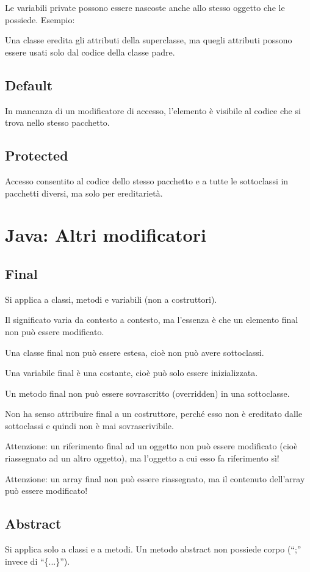 \documentclass[10pt]{article}
\begin{document}
Le variabili private possono essere nascoste anche allo stesso oggetto che le possiede.
Esempio:

Una classe eredita gli attributi della superclasse, ma quegli attributi possono essere usati solo dal codice della classe padre.
\subsection{Default}
In mancanza di un modificatore di accesso, l'elemento è visibile al codice che si trova nello stesso pacchetto.
\subsection{Protected}
Accesso consentito al codice dello stesso pacchetto e a tutte le sottoclassi in pacchetti diversi, ma solo per ereditarietà.
\section{Java: Altri modificatori}
\subsection{Final}
Si applica a classi, metodi e variabili (non a costruttori).

Il significato varia da contesto a contesto, ma l’essenza è che un elemento final non può essere modificato.

Una classe final non può essere estesa, cioè non può avere sottoclassi.

Una variabile final è una costante, cioè può solo essere inizializzata.

Un metodo final non può essere sovrascritto (overridden) in
una sottoclasse.

Non ha senso attribuire final a un costruttore, perché esso
non è ereditato dalle sottoclassi e quindi non è mai sovrascrivibile.

Attenzione: un riferimento final ad un oggetto non può essere
modificato (cioè riassegnato ad un altro oggetto), ma l’oggetto a cui esso fa riferimento sì!

Attenzione: un array final non può essere riassegnato, ma il
contenuto dell’array può essere modificato!
\subsection{Abstract}
Si applica solo a classi e a metodi.
Un metodo abstract non possiede corpo (“;” invece di “\{...\}”).
\end{document}
